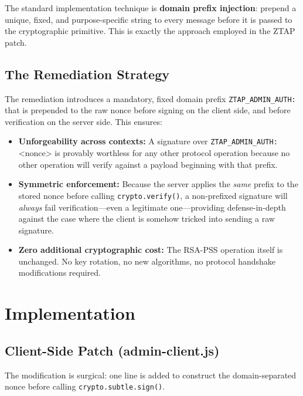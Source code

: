 \documentclass[12pt,a4paper]{article}
\begin{document}
The standard implementation technique is \textbf{domain prefix injection}: prepend a unique, fixed, and purpose-specific string to every message before it is passed to the cryptographic primitive. This is exactly the approach employed in the ZTAP patch.

\subsection{The Remediation Strategy}

The remediation introduces a mandatory, fixed domain prefix \texttt{ZTAP\_ADMIN\_AUTH:} that is prepended to the raw nonce before signing on the client side, and before verification on the server side. This ensures:

\begin{itemize}
    \item \textbf{Unforgeability across contexts:} A signature over \texttt{ZTAP\_ADMIN\_AUTH:}<nonce> is provably worthless for any other protocol operation because no other operation will verify against a payload beginning with that prefix.
    \item \textbf{Symmetric enforcement:} Because the server applies the \textit{same} prefix to the stored nonce before calling \texttt{crypto.verify()}, a non-prefixed signature will \textit{always} fail verification---even a legitimate one---providing defense-in-depth against the case where the client is somehow tricked into sending a raw signature.
    \item \textbf{Zero additional cryptographic cost:} The RSA-PSS operation itself is unchanged. No key rotation, no new algorithms, no protocol handshake modifications required.
\end{itemize}

\section{Implementation}

\subsection{Client-Side Patch (admin-client.js)}

The modification is surgical: one line is added to construct the domain-separated nonce before calling \texttt{crypto.subtle.sign()}.
\end{document}
